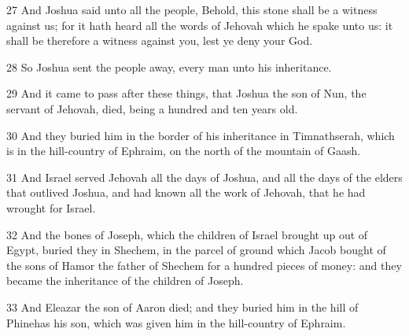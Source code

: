 \par 27 And Joshua said unto all the people, Behold, this stone shall be a witness against us; for it hath heard all the words of Jehovah which he spake unto us: it shall be therefore a witness against you, lest ye deny your God.
\par 28 So Joshua sent the people away, every man unto his inheritance.
\par 29 And it came to pass after these things, that Joshua the son of Nun, the servant of Jehovah, died, being a hundred and ten years old.
\par 30 And they buried him in the border of his inheritance in Timnathserah, which is in the hill-country of Ephraim, on the north of the mountain of Gaash.
\par 31 And Israel served Jehovah all the days of Joshua, and all the days of the elders that outlived Joshua, and had known all the work of Jehovah, that he had wrought for Israel.
\par 32 And the bones of Joseph, which the children of Israel brought up out of Egypt, buried they in Shechem, in the parcel of ground which Jacob bought of the sons of Hamor the father of Shechem for a hundred pieces of money: and they became the inheritance of the children of Joseph.
\par 33 And Eleazar the son of Aaron died; and they buried him in the hill of Phinehas his son, which was given him in the hill-country of Ephraim.

